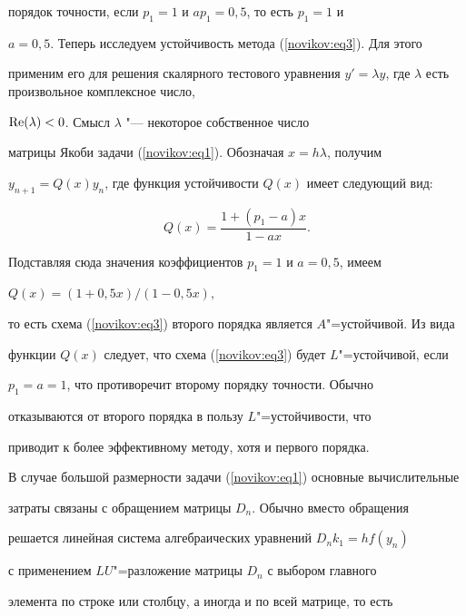 порядок точности, если $p_1=1$ и $ap_1=0,5$, то есть $p_1=1$ и

$a=0,5$. Теперь исследуем устойчивость метода (\ref{novikov:eq3}). Для этого

применим его для решения скалярного тестового уравнения $y'=\lambda

y$, где $\lambda$ есть произвольное комплексное число,

$\rm{Re}(\lambda)<0$. Смысл $\lambda$ "--- некоторое собственное число

матрицы Якоби задачи (\ref{novikov:eq1}). Обозначая $x=h\lambda$, получим

$y_{n+1}=Q(x)y_n$, где функция устойчивости $Q(x)$ имеет следующий вид:

\begin{equation*}

Q(x)=\frac{1+(p_1-a)x}{1-ax}.

\end{equation*}

Подставляя сюда значения коэффициентов $p_1=1$ и $a=0,5$, имеем


$Q(x)=({1+0,5x})/({1-0,5x}),


$

то есть схема (\ref{novikov:eq3}) второго порядка является $A$"=устойчивой. Из вида

функции $Q(x)$ следует, что схема (\ref{novikov:eq3}) будет $L$"=устойчивой, если

$p_1=a=1$, что противоречит второму порядку точности. Обычно

отказываются от второго порядка в пользу $L$"=устойчивости, что

приводит к более эффективному методу, хотя и первого порядка.



В случае большой размерности задачи (\ref{novikov:eq1}) основные вычислительные

затраты связаны с обращением матрицы $D_n$. Обычно вместо обращения

решается линейная система алгебраических уравнений $D_nk_1=hf(y_n)$

с применением $LU$"=разложение матрицы $D_n$ с выбором главного

элемента по строке или столбцу, а иногда и по всей матрице, то есть

